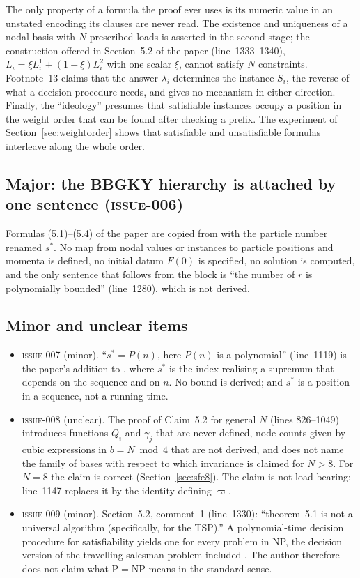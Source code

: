 \documentclass[11pt,a4paper]{article}
\newcommand{\paperline}[1]{(line~#1)}
\newcommand{\issue}[1]{\textrm{\mdseries\textsc{issue-#1}}}
\begin{document}
The only property of a formula the proof ever uses is its numeric value in an unstated encoding; its clauses are never read. The existence and uniqueness of a nodal basis with $N$ prescribed loads is asserted in the second stage; the construction offered in Section~5.2 of the paper \paperline{1333--1340}, $L_i=\xi L_i^1+(1-\xi)L_i^2$ with one scalar $\xi$, cannot satisfy $N$ constraints. Footnote~13 claims that the answer $\lambda_i$ determines the instance $S_i$, the reverse of what a decision procedure needs, and gives no mechanism in either direction. Finally, the ``ideology'' presumes that satisfiable instances occupy a position in the weight order that can be found after checking a prefix. The experiment of Section~\ref{sec:weightorder} shows that satisfiable and unsatisfiable formulas interleave along the whole order.

\subsection{Major: the BBGKY hierarchy is attached by one sentence (\issue{006})}

Formulas (5.1)--(5.4) of the paper are copied from \cite{gerasimenko} with the particle number renamed $s^*$. No map from nodal values or instances to particle positions and momenta is defined, no initial datum $F(0)$ is specified, no solution is computed, and the only sentence that follows from the block is ``the number of $r$ is polynomially bounded'' \paperline{1280}, which is not derived.

\subsection{Minor and unclear items}

\begin{itemize}
\item \issue{007} (minor). ``$s^*=P(n)$, here $P(n)$ is a polynomial'' \paperline{1119} is the paper's addition to \cite{stepanets}, where $s^*$ is the index realising a supremum that depends on the sequence and on $n$. No bound is derived; and $s^*$ is a position in a sequence, not a running time.
\item \issue{008} (unclear). The proof of Claim~5.2 for general $N$ (lines 826--1049) introduces functions $Q_i$ and $\gamma_j$ that are never defined, node counts given by cubic expressions in $b=N\bmod 4$ that are not derived, and does not name the family of bases with respect to which invariance is claimed for $N>8$. For $N=8$ the claim is correct (Section~\ref{sec:sfe8}). The claim is not load-bearing: line~1147 replaces it by the identity defining $\varpi$.
\item \issue{009} (minor). Section~5.2, comment~1 \paperline{1330}: ``theorem~5.1 is not a universal algorithm (specifically, for the TSP).'' A polynomial-time decision procedure for satisfiability yields one for every problem in NP, the decision version of the travelling salesman problem included \cite{cook,karp}. The author therefore does not claim what $\mathrm{P}=\mathrm{NP}$ means in the standard sense.
\end{itemize}
\end{document}
